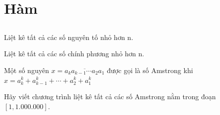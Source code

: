 \chapter{Hàm}
\hypertarget{localtoc\thechapter}{}
\localtoc %

\section{}

\begin{problem}
    Liệt kê tất cả các số nguyên tố nhỏ hơn n.
\end{problem}

\begin{problem}
    Liệt kê tất cả các số chính phương nhỏ hơn n.
\end{problem}
\begin{problem}
    Một số nguyên $𝑥 = \overline{a_ka_{k-1} \cdots a_2a_1}$ được gọi là số Amstrong khi 
    $ x = a^k_{k} + a_{k-1}^k + \cdots + a_2^k + a_1^k$

Hãy viết chương trình liệt kê tất cả các số Amstrong nằm trong đoạn $[1,1.000.000]$.
\end{problem}
